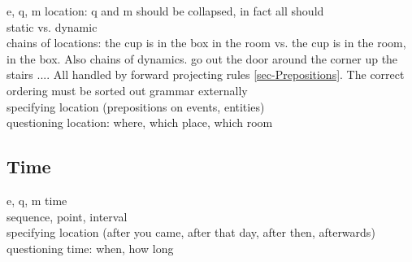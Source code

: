 e, q, m location: q and m should be collapsed, in fact all should \\
static vs. dynamic \\
chains of locations: the cup is in the box in the room vs. the cup is in the room, in the box. Also chains of dynamics.  go out the door around the corner up the stairs ....  All handled by forward projecting rules \ref{sec-Prepositions}. The correct ordering must be sorted out grammar externally \\
specifying location (prepositions on events, entities) \\
questioning location: where, which place, which room \\

\subsection{Time}

e, q, m time \\
sequence, point, interval \\
specifying location (after you came, after that day, after then, afterwards) \\
questioning time: when, how long \\


